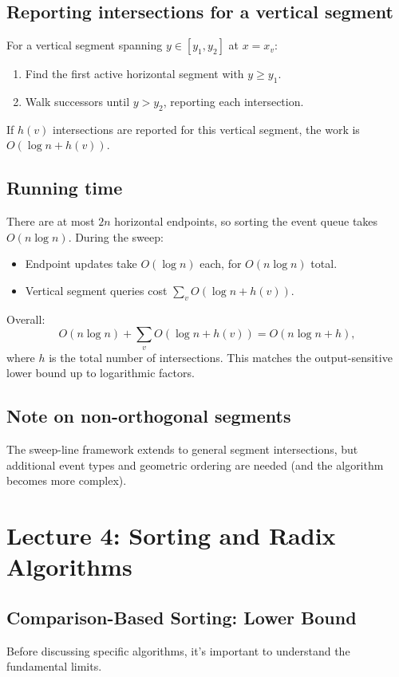 \documentclass[11pt]{article}
\begin{document}
\subsection*{Reporting intersections for a vertical segment}
For a vertical segment spanning $y \in [y_1, y_2]$ at $x = x_v$:
\begin{enumerate}
\item Find the first active horizontal segment with $y \ge y_1$.
\item Walk successors until $y > y_2$, reporting each intersection.
\end{enumerate}
If $h(v)$ intersections are reported for this vertical segment, the work is
$O(\log n + h(v))$.

\subsection*{Running time}
There are at most $2n$ horizontal endpoints, so sorting the event queue takes $O(n \log n)$. During
the sweep:
\begin{itemize}
\item Endpoint updates take $O(\log n)$ each, for $O(n \log n)$ total.
\item Vertical segment queries cost $\sum_v O(\log n + h(v))$.
\end{itemize}
Overall:
\[
O(n \log n) + \sum_v O(\log n + h(v)) = O(n \log n + h),
\]
where $h$ is the total number of intersections. This matches the output-sensitive lower bound up
to logarithmic factors.

\subsection*{Note on non-orthogonal segments}
The sweep-line framework extends to general segment intersections, but additional event types and
geometric ordering are needed (and the algorithm becomes more complex).

\section{Lecture 4: Sorting and Radix Algorithms}

\subsection*{Comparison-Based Sorting: Lower Bound}

Before discussing specific algorithms, it's important to understand the fundamental limits.
\end{document}
